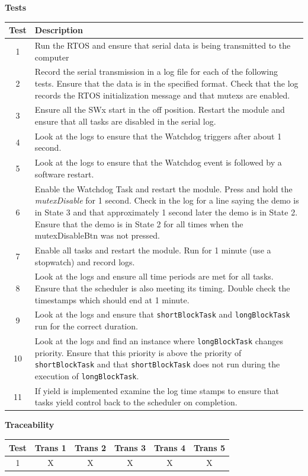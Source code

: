 \documentclass{article}
\begin{document}
\textbf{Tests}\\
\begin{tabular}{c | p{30em} }
Test & Description \\ \hline
1 & Run the RTOS and ensure that serial data is being transmitted to the computer \\
2 & Record the serial transmission in a log file for each of the following tests. Ensure that the data is in the specified format. Check that the log records the RTOS initialization message and that mutexs are enabled. \\
3 & Ensure all the SWx start in the off position. Restart the module and ensure that all tasks are disabled in the serial log. \\
4 & Look at the logs to ensure that the Watchdog triggers after about 1 second. \\
5 & Look at the logs to ensure that the Watchdog event is followed by a software restart. \\
6 & Enable the Watchdog Task and restart the module. Press and hold the \textit{mutexDisable} for 1 second. Check in the log for a line saying the demo is in State 3 and that approximately 1 second later the demo is in State 2. Ensure that the demo is in State 2 for all times when the mutexDisableBtn was not pressed. \\
7 & Enable all tasks and restart the module. Run for 1 minute (use a stopwatch) and record logs. \\
8 & Look at the logs and ensure all time periods are met for all tasks. Ensure that the scheduler is also meeting its timing. Double check the timestamps which should end at 1 minute. \\
9 & Look at the logs and ensure that \texttt{shortBlockTask} and \texttt{longBlockTask} run for the correct duration. \\
10 & Look at the logs and find an instance where \texttt{longBlockTask} changes priority. Ensure that this priority is above the priority of \texttt{shortBlockTask} and that \texttt{shortBlockTask} does not run during the execution of \texttt{longBlockTask}. \\
11 & If yield is implemented examine the log time stamps to ensure that tasks yield control back to the scheduler on completion.
\end{tabular}

\vspace*{2em}

\textbf{Traceability} \\
\begin{tabular}{c | c | c | c | c | c}
Test & Trans 1 & Trans 2 & Trans 3 & Trans 4 & Trans 5 \\ \hline
1 & X & X & X & X & X \\
\end{tabular}
\end{document}
